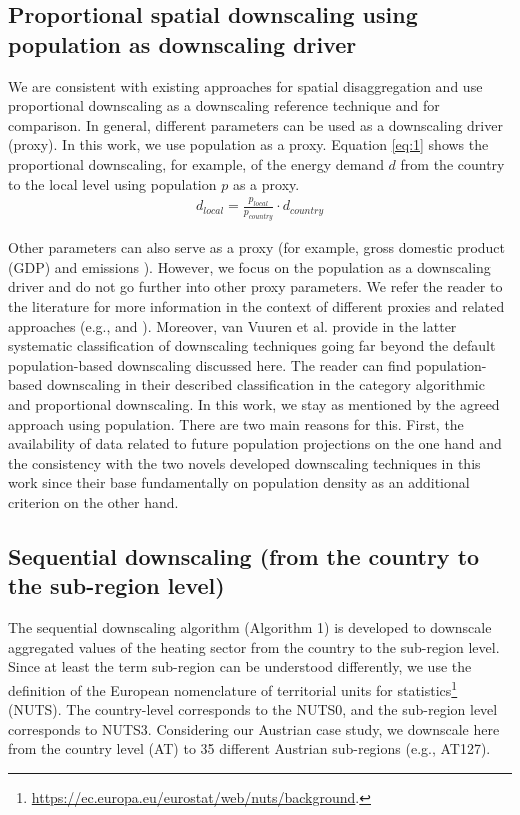 \subsection{Proportional spatial downscaling using population as downscaling driver}\label{pop}
We are consistent with existing approaches for spatial disaggregation and use proportional downscaling as a downscaling reference technique and for comparison. In general, different parameters can be used as a downscaling driver (proxy). In this work, we use population as a proxy. Equation \ref{eq:1} shows the proportional downscaling, for example, of the energy demand  $d$ from the country to the local level using population $p$ as a proxy. 
\begin{align}\label{eq:1}
d_{local}=\frac{p_{local}}{p_{country}} \cdot d_{country}
\end{align}

Other parameters can also serve as a proxy (for example, gross domestic product (GDP) and emissions \cite{van2007downscaling}). However, we focus on the population as a downscaling driver and do not go further into other proxy parameters. We refer the reader to the literature for more information in the context of different proxies and related approaches (e.g., \cite{van2006downscaling} and \cite{van2010downscaling}). Moreover, van Vuuren et al. provide in the latter systematic classification of downscaling techniques going far beyond the default population-based downscaling discussed here. The reader can find population-based downscaling in their described classification in the category algorithmic and proportional downscaling. In this work, we stay as mentioned by the agreed approach using population. There are two main reasons for this. First, the availability of data related to future population projections on the one hand and the consistency with the two novels developed downscaling techniques in this work since their base fundamentally on population density as an additional criterion on the other hand. 

\subsection{Sequential downscaling (from the country to the sub-region level)}\label{alg1}
The sequential downscaling algorithm (Algorithm 1) is developed to downscale aggregated values of the heating sector from the country to the sub-region level. Since at least the term sub-region can be understood differently, we use the definition of the European nomenclature of territorial units for statistics\footnote{\url{https://ec.europa.eu/eurostat/web/nuts/background}.} (NUTS). The country-level corresponds to the NUTS0, and the sub-region level corresponds to NUTS3. Considering our Austrian case study, we downscale here from the country level (AT) to \SI{35}{} different Austrian sub-regions (e.g., AT127).\newline

